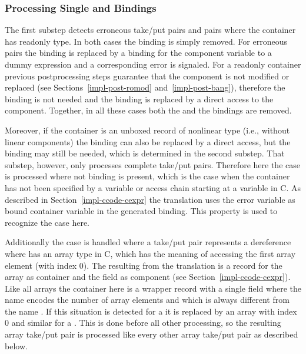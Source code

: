 \subsubsection{Processing Single  and  Bindings}

The first substep detects erroneous take/put pairs and pairs where the container has readonly type. In both cases the  binding
is simply removed. For erroneous pairs the  binding is replaced by a binding for the component variable to a
dummy expression and a corresponding error is signaled. For a readonly container previous postprocessing steps guarantee
that the component is not modified or replaced (see Sections~\ref{impl-post-romod} and~\ref{impl-post-bang}), therefore the
 binding is not needed and the  binding is replaced by a direct access to the component. Together, in
all these cases both the  and the  bindings are removed.

Moreover, if the container is an unboxed record of nonlinear type (i.e., without linear components) the  binding
can also be replaced by a direct access, but the  binding may still be needed, which is determined in the second
substep. That substep, however, only processes complete take/put pairs. Therefore here the case is processed where not 
binding is present, which is the case when the container has not been specified by a variable or access chain starting at a
variable in C. As described in Section~\ref{impl-ccode-cexpr} the translation uses the error variable as bound container variable
in the generated  binding. This property is used to recognize the case here.

Additionally the case is handled where a take/put pair represents a dereference  where  has an array type in C,
which has the meaning of accessing the first array element (with index 0). The  resulting from the translation is a
record  for the array as container and the field  as component (see Section~\ref{impl-ccode-cexpr}). Like
all arrays the container here is a wrapper record with a single field where the name encodes the number of array elements and
which is always different from the name . If this situation is detected for a  it is replaced by an array
 with index 0 and similar for a . This is done before all other processing, so the resulting array take/put
pair is processed like every other array take/put pair as described below.

